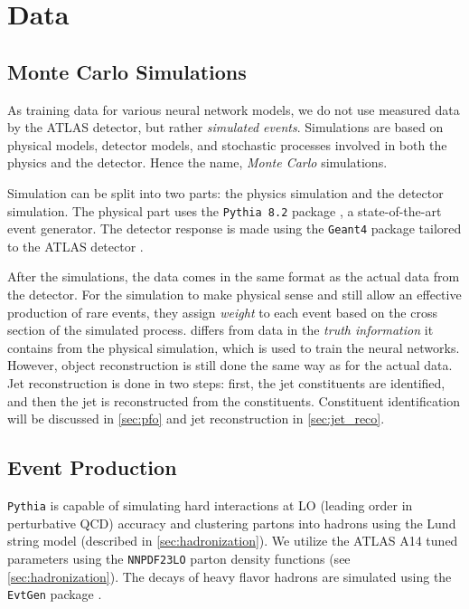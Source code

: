 \chapter{Data}
\label{ch:data}

\section{Monte Carlo Simulations}
\label{sec:mc_simluation}
As training data for various neural network models, we do not use measured data by the ATLAS detector, but rather \emph{simulated events}. 
Simulations are based on physical models, detector models, and stochastic processes involved in both the physics and the detector.
Hence the name, \emph{Monte Carlo} simulations.

Simulation can be split into two parts: the physics simulation and the detector simulation.
The physical part uses the \texttt{Pythia 8.2} package \cite{pythia}, a state-of-the-art event generator.
The detector response is made using the \texttt{Geant4} package \cite{geant4} tailored to the ATLAS detector \cite{atlas_sym}.

After the simulations, the \MC data comes in the same format as the actual data from the detector.
For the simulation to make physical sense and still allow an effective production of rare events, they assign \emph{weight} to each event based on the cross section of the simulated process.
\MC differs from data in the \emph{truth information} it contains from the physical simulation, which is used to train the neural networks.
However, object reconstruction is still done the same way as for the actual data.
Jet reconstruction is done in two steps: first, the jet constituents are identified, and then the jet is reconstructed from the constituents. 
Constituent identification will be discussed in \cref{sec:pfo} and jet reconstruction in \cref{sec:jet_reco}.

\section{Event Production}
\label{sec:event_production}
\texttt{Pythia} is capable of simulating hard interactions at LO (leading order in perturbative QCD) accuracy and clustering partons into hadrons using the Lund string model (described in \cref{sec:hadronization}).
We utilize the ATLAS A14 tuned parameters \cite{atlas_A14_tunes} using the \texttt{NNPDF23LO} \cite{NNPDF23LO} parton density functions (see \cref{sec:hadronization}).
The decays of heavy flavor hadrons are simulated using the \texttt{EvtGen} package \cite{EvtGen}.

